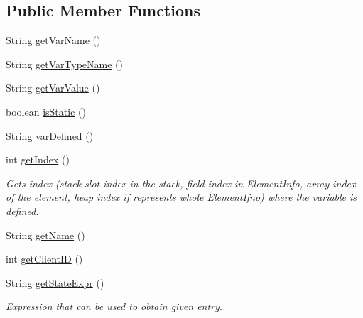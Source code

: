 \subsection*{Public Member Functions}
\begin{DoxyCompactItemize}
\item 
String \hyperlink{classgov_1_1nasa_1_1jpf_1_1inspector_1_1common_1_1pse_1_1_p_s_e_variable_ad1dc9e7dbc65a93af7c028831963c26f}{get\+Var\+Name} ()
\item 
String \hyperlink{classgov_1_1nasa_1_1jpf_1_1inspector_1_1common_1_1pse_1_1_p_s_e_variable_ae3ebfecacb0600cb08019e22c220d888}{get\+Var\+Type\+Name} ()
\item 
String \hyperlink{classgov_1_1nasa_1_1jpf_1_1inspector_1_1common_1_1pse_1_1_p_s_e_variable_a58c0acb6295c44b5f04af6b04dca0641}{get\+Var\+Value} ()
\item 
boolean \hyperlink{classgov_1_1nasa_1_1jpf_1_1inspector_1_1common_1_1pse_1_1_p_s_e_variable_aabbed2b1c69ba2d76924bfa645a1502e}{is\+Static} ()
\item 
String \hyperlink{classgov_1_1nasa_1_1jpf_1_1inspector_1_1common_1_1pse_1_1_p_s_e_variable_aad5dd7fa8129442acd6fa032e1e2f59b}{var\+Defined} ()
\item 
int \hyperlink{classgov_1_1nasa_1_1jpf_1_1inspector_1_1common_1_1pse_1_1_p_s_e_variable_ae8822dec7015fb0e5509dc4f01e18232}{get\+Index} ()
\begin{DoxyCompactList}\small\item\em Gets index (stack slot index in the stack, field index in Element\+Info, array index of the element, heap index if represents whole Element\+Ifno) where the variable is defined. \end{DoxyCompactList}\item 
String \hyperlink{classgov_1_1nasa_1_1jpf_1_1inspector_1_1common_1_1pse_1_1_program_state_entry_ac96b4ceba0c8c9c674b0cca509b63a3b}{get\+Name} ()
\item 
int \hyperlink{classgov_1_1nasa_1_1jpf_1_1inspector_1_1common_1_1pse_1_1_program_state_entry_a5f1b62c50f124c1bd01be0111706a1f5}{get\+Client\+ID} ()
\item 
String \hyperlink{classgov_1_1nasa_1_1jpf_1_1inspector_1_1common_1_1pse_1_1_program_state_entry_a9d819571ca1cc982a7d31df70548fd96}{get\+State\+Expr} ()
\begin{DoxyCompactList}\small\item\em Expression that can be used to obtain given entry. \end{DoxyCompactList}\end{DoxyCompactItemize}
